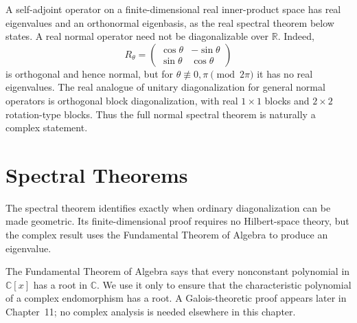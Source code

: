 \begin{remark}
A self-adjoint operator on a finite-dimensional real inner-product space has
real eigenvalues and an orthonormal eigenbasis, as the real spectral theorem
below states.  A real normal operator need not be diagonalizable over
\(\mathbb R\).  Indeed,
\[
R_\theta=
\begin{pmatrix}
\cos\theta&-\sin\theta\\
\sin\theta&\cos\theta
\end{pmatrix}
\]
is orthogonal and hence normal, but for
\(\theta\not\equiv0,\pi\pmod{2\pi}\) it has no real eigenvalues.  The real analogue
of unitary diagonalization for general normal operators is orthogonal block
diagonalization, with real \(1\times1\) blocks and \(2\times2\)
rotation-type blocks.  Thus the full normal spectral theorem is naturally a
complex statement.
\end{remark}

\section{Spectral Theorems}

The spectral theorem identifies exactly when ordinary diagonalization can be
made geometric. Its finite-dimensional proof requires no Hilbert-space
theory, but the complex result uses the Fundamental Theorem of Algebra to
produce an eigenvalue.

\begin{remark}
The Fundamental Theorem of Algebra says that every nonconstant polynomial in
\(\mathbb C[x]\) has a root in \(\mathbb C\). We use it only to ensure that
the characteristic polynomial of a complex endomorphism has a root. A
Galois-theoretic proof appears later in Chapter~11; no complex analysis is
needed elsewhere in this chapter.
\end{remark}

